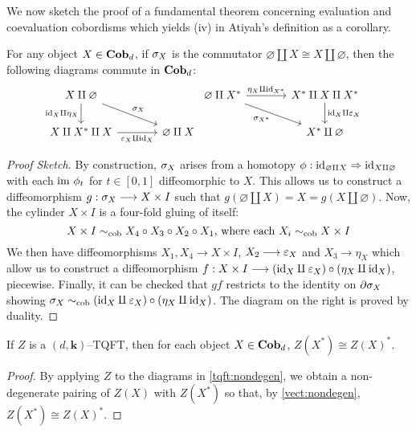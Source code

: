 We now sketch the proof of a fundamental theorem concerning evaluation and
coevaluation cobordisms \cite[\S 1.1.8]{KockFA} which yields (iv) in Atiyah's
definition as a corollary.

\begin{thm}\label{tqft:nondegen}
For any object $X \in \textbf{Cob}_d$, if $\sigma_X$ is the commutator
$\varnothing \amalg X \cong X \amalg \varnothing$, then the following diagrams
commute in $\textbf{Cob}_d$:
\begin{eqnarray*}
\begin{tikzcd}[column sep=large]
X \amalg \varnothing
  \arrow[d, "\id_{X} \amalg \eta_X" left]
  \arrow[rd, "\sgm_X" above right] & \\
X \amalg X^* \amalg X \arrow[r, "\eps_X \amalg \id_X" below]
& \varnothing \amalg X
\end{tikzcd} &
\begin{tikzcd}[column sep=large]
\varnothing \amalg X^*
  \arrow[r, "\eta_X \amalg \id_{X^*}" above]
  \arrow[rd, "\sgm_{X^*}" below left] &
X^* \amalg X \amalg X^* \arrow[d, "\id_X \amalg \eps_X" right] \\
& X^* \amalg \varnothing
\end{tikzcd}
\end{eqnarray*}
\end{thm}
\begin{proof}[Proof Sketch]
By construction, $\sigma_X$ arises from a homotopy
$\phi : \text{id}_{\varnothing \amalg X} \Rightarrow \text{id}_{X \amalg \varnothing}$ with
each $\text{im } \phi_t$ for $t \in [0, 1]$ diffeomorphic to $X$. This allows us to
construct a diffeomorphism $g : \sigma_X \stackrel{}{\longrightarrow} X \times I$ such that
$g(\varnothing \amalg X) = X = g(X \amalg \varnothing)$. Now, the cylinder
$X \times I$ is a four-fold gluing of itself:
\[
  X \times I \sim_{\text{cob}} X_4 \circ X_3 \circ X_2 \circ X_1 \text{, where each }
    X_i \sim_{\text{cob}} X \times I
\]
We then have diffeomorphisms $X_1, X_4 \to X \times I$, $X_2 \stackrel{}{\longrightarrow} \varepsilon_X$
and $X_3 \to \eta_X$ which allow us to construct a diffeomorphism
$f : X \times I \stackrel{}{\longrightarrow} (\text{id}_X \amalg \varepsilon_X) \circ (\eta_X \amalg \text{id}_X)$,
piecewise. Finally, it can be checked that $gf$ restricts to the identity on
$\partial \sigma_X$ showing
$\sigma_X \sim_{\text{cob}} (\text{id}_X \amalg \varepsilon_X) \circ (\eta_X \amalg \text{id}_X)$.
The diagram on the right is proved by duality.
\end{proof}

\begin{cor}
If $Z$ is a $(d, \mathbf{k})$--TQFT, then for each object $X \in \textbf{Cob}_d$,
$Z(X^*) \cong Z(X)^*$.
\end{cor}
\begin{proof}
By applying $Z$ to the diagrams in \ref{tqft:nondegen}, we obtain a
non-degenerate pairing of $Z(X)$ with $Z(X^*)$ so that, by \ref{vect:nondegen},
$Z(X^*) \cong Z(X)^*$.
\end{proof}

